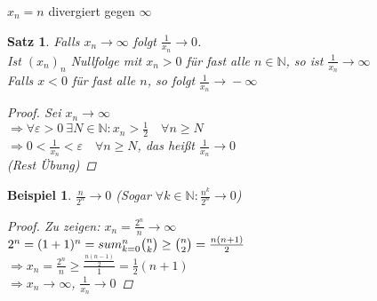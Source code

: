 \documentclass[11pt, twoside, a4paper]{article}
\theoremstyle{plain}
\newtheorem{satz}[blockelement]{Satz}
\newtheorem{beispiel}[blockelement]{Beispiel}
\newcommand{\impl}[0]{\Rightarrow{}}
\newcommand{\fromto}{\rightarrow{}}
\newcommand{\naturalnumbers}{\mathbb{N}}
\begin{document}
    $x_n=n$ divergiert gegen $\infty$

    \begin{satz}
        Falls $x_n\fromto \infty$ folgt $\frac{1}{x_n}\fromto 0$.\\
        Ist $(x_n)_n$ Nullfolge mit $x_n > 0$ für fast alle $n\in\naturalnumbers$, so ist $\frac{1}{x_n}\fromto \infty$\\
        Falls $x < 0$ für fast alle $n$, so folgt $\frac{1}{x_n} \fromto -\infty$
        \begin{proof}
            Sei $x_n\fromto \infty$\\
            $\impl \forall \varepsilon > 0~\exists N\in\naturalnumbers\colon x_n > \frac{1}{2}\quad\forall n \geq N$\\
            $\impl 0 < \frac{1}{x_n} < \varepsilon\quad \forall n \geq N$, das heißt $\frac{1}{x_n}\fromto 0$\\
            (Rest Übung)
        \end{proof}
    \end{satz}

    \begin{beispiel}
        $\frac{n}{2^n}\fromto 0$ (Sogar $\forall k\in\naturalnumbers\colon \frac{n^k}{2^n} \fromto 0$)

        \begin{proof}
            Zu zeigen: $x_n = \frac{2^n}{n}\fromto \infty$\\
            $2^n = (1+1)^n = \\sum_{k=0}^{n} \binom{n}{k}\geq \binom{n}{2} = \frac{n(n+1)}{2}$\\
            $\impl x_n = \frac{2^n}{n}\geq \frac{\frac{n(n-1)}{2}}{1} = \frac{1}{2}(n+1)$\\
            $\impl x_n \fromto \infty$, $\frac{1}{x_n}\fromto 0$
        \end{proof}
    \end{beispiel}
\end{document}
